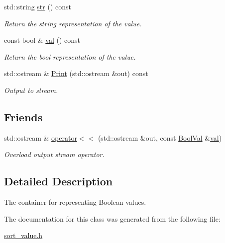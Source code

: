 \begin{DoxyCompactItemize}
std\+::string \mbox{\hyperlink{classilang_1_1_bool_val_a98a6e4a4d7e449a47cb630327cf0b23a}{str}} () const
\begin{DoxyCompactList}\small\item\em Return the string representation of the value. \end{DoxyCompactList}\item 
\mbox{\label{classilang_1_1_bool_val_a7f6bbc41e3756c774a28f3b43ebc9120}} 
const bool \& \mbox{\hyperlink{classilang_1_1_bool_val_a7f6bbc41e3756c774a28f3b43ebc9120}{val}} () const
\begin{DoxyCompactList}\small\item\em Return the bool representation of the value. \end{DoxyCompactList}\item 
\mbox{\label{classilang_1_1_bool_val_a1df186f08d40141abb855bed1a2c205c}} 
std\+::ostream \& \mbox{\hyperlink{classilang_1_1_bool_val_a1df186f08d40141abb855bed1a2c205c}{Print}} (std\+::ostream \&out) const
\begin{DoxyCompactList}\small\item\em Output to stream. \end{DoxyCompactList}\end{DoxyCompactItemize}
\subsection*{Friends}
\begin{DoxyCompactItemize}
\item 
\mbox{\label{classilang_1_1_bool_val_aafea591c39421f4a44b0d1b1e95fd9a7}} 
std\+::ostream \& \mbox{\hyperlink{classilang_1_1_bool_val_aafea591c39421f4a44b0d1b1e95fd9a7}{operator$<$$<$}} (std\+::ostream \&out, const \mbox{\hyperlink{classilang_1_1_bool_val}{Bool\+Val}} \&\mbox{\hyperlink{classilang_1_1_bool_val_a7f6bbc41e3756c774a28f3b43ebc9120}{val}})
\begin{DoxyCompactList}\small\item\em Overload output stream operator. \end{DoxyCompactList}\end{DoxyCompactItemize}


\subsection{Detailed Description}
The container for representing Boolean values. 

The documentation for this class was generated from the following file\+:\begin{DoxyCompactItemize}
\item 
\mbox{\hyperlink{sort__value_8h}{sort\+\_\+value.\+h}}\end{DoxyCompactItemize}
